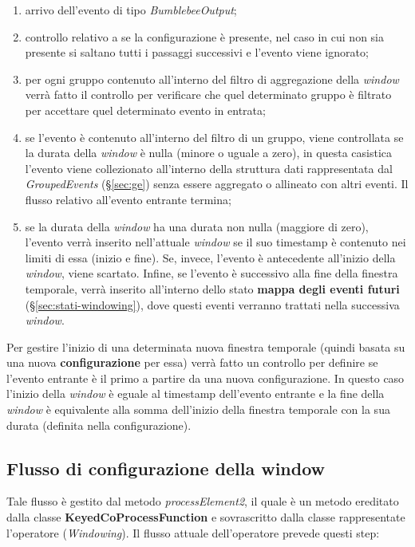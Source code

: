\begin{enumerate}
	\item{arrivo dell'evento di tipo \textit{BumblebeeOutput};}
	\item{controllo relativo a se la configurazione è presente, nel caso in cui non sia presente si saltano tutti i passaggi successivi e l'evento viene ignorato;}
	\item{per ogni gruppo contenuto all'interno del filtro di aggregazione della \textit{window} verrà fatto il controllo per verificare che quel determinato gruppo è filtrato per accettare quel determinato evento in entrata;}
\item{se l'evento è contenuto all'interno del filtro di un gruppo, viene controllata se la durata della \textit{window} è nulla (minore o uguale a zero), in questa casistica l'evento viene collezionato all'interno della struttura dati rappresentata dal \textit{GroupedEvents} (\S\ref{sec:ge}) senza essere aggregato o allineato con altri eventi. Il flusso relativo all'evento entrante termina;}
\item{se la durata della \textit{window} ha una durata non nulla (maggiore di zero), l'evento verrà inserito nell'attuale \textit{window} se il suo \gls{timestamp} è contenuto nei limiti di essa (inizio e fine). Se, invece, l'evento è antecedente all'inizio della \textit{window}, viene scartato. Infine, se l'evento è successivo alla fine della finestra temporale, verrà inserito all'interno dello stato \textbf{mappa degli eventi futuri} (\S\ref{sec:stati-windowing}), dove questi eventi verranno trattati nella successiva \textit{window}.}
\end{enumerate}

Per gestire l'inizio di una determinata nuova finestra temporale (quindi basata su una nuova \textbf{configurazione} per essa) verrà fatto un controllo per definire se l'evento entrante è il primo a partire da una nuova configurazione. In questo caso l'inizio della \textit{window} è eguale al \gls{timestamp} dell'evento entrante e la fine della \textit{window} è equivalente alla somma dell'inizio della finestra temporale con la sua durata (definita nella configurazione).
\subsection{Flusso di configurazione della window}\label{sec:pr2-windowing}
Tale flusso è gestito dal metodo \textit{processElement2}, il quale è un metodo ereditato dalla classe \textbf{KeyedCoProcessFunction} e sovrascritto dalla classe rappresentate l'operatore (\textit{Windowing}). Il flusso attuale dell'operatore prevede questi step:

